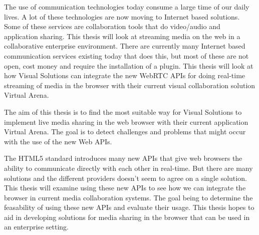 
The use of communication technologies today consume a large time of our daily lives. A lot of these technologies are now moving to Internet based solutions. Some of these services are collaboration tools that do video/audio and application sharing. This thesis will look at streaming media on the web in a collaborative enterprise environment. There are currently many Internet based communication services existing today that does this, but most of these are not open, cost money and require the installation of a plugin. This thesis will look at how Visual Solutions can integrate the new WebRTC APIs for doing real-time streaming of media in the browser with their current visual collaboration solution Virtual Arena.

The aim of this thesis is to find the most suitable way for Visual Solutions to implement live media sharing in the web browser with their current application Virtual Arena. The goal is to detect challenges and problems that might occur with the use of the new Web APIs.

The HTML5 standard introduces many new APIs that give web browsers the ability to communicate directly with each other in real-time. But there are many solutions and the different providers doesn't seem to agree on a single solution. This thesis will examine using these new APIs to see how we can integrate the browser in current media collaboration systems. The goal being to determine the feasability of using these new APIs and evaluate their usage. This thesis hopes to aid in developing solutions for media sharing in the browser that can be used in an enterprise setting. 